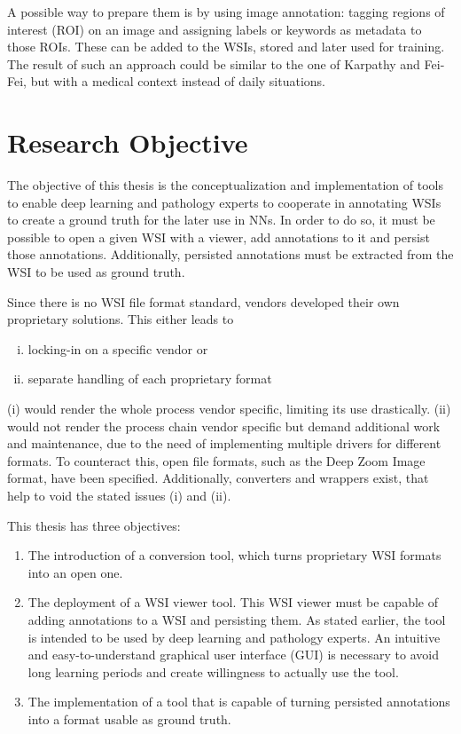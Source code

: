 A possible way to prepare them is by using image annotation: tagging regions of interest (ROI) on an image and assigning labels or keywords as metadata to those ROIs. These can be added to the WSIs, stored and later used for training. The result of such an approach could be similar to the one of Karpathy and Fei-Fei\cite{Karpathy15}, but with a medical context instead of daily situations.


\section{Research Objective}
\label{sec1_researchObjective}
The objective of this thesis is the conceptualization and implementation of tools to enable deep learning and pathology experts to cooperate in annotating WSIs to create a ground truth for the later use in NNs. In order to do so, it must be possible to open a given WSI with a viewer, add annotations to it and persist those annotations. Additionally, persisted annotations must be extracted from the WSI to be used as ground truth.

Since there is no WSI file format standard, vendors developed their own proprietary solutions\cite{Cornish13}. This either leads to

\begin{enumerate}[(i)]
	\item locking-in on a specific vendor or
	\item separate handling of each proprietary format
\end{enumerate}

(i) would render the whole process vendor specific, limiting its use drastically. (ii) would not render the process chain vendor specific but demand additional work and maintenance, due to the need of implementing multiple drivers for different formats. To counteract this, open file formats, such as the Deep Zoom Image format, have been specified\cite{Cornish13}. Additionally, converters and wrappers exist, that help to void the stated issues (i) and (ii). 

This thesis has three objectives:
\begin{enumerate}[(1)]
	\item The introduction of a conversion tool, which turns proprietary WSI formats into an open one.
	\item The deployment of a WSI viewer tool. This WSI viewer must be capable of adding annotations to a WSI and persisting them. As stated earlier, the tool is intended to be used by deep learning and pathology experts. An intuitive and easy-to-understand graphical user interface (GUI) is necessary to avoid long learning periods and create willingness to actually use the tool.
	\item The implementation of a tool that is capable of turning persisted annotations into a format usable as ground truth.
\end{enumerate}


